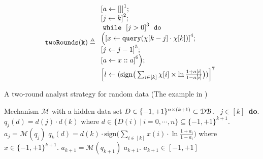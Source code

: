     \begin{example}
        \[
            \kw{twoRounds(k)} \triangleq
        \begin{array}{l}
               \clabel{ a \leftarrow []}^{1} ; \\
                \clabel{\assign{j}{k} }^{2} ; \\
                \ewhile ~ \clabel{j > 0}^{3} ~ \edo ~ \\
                \Big(
                 \clabel{\assign{x}{\query(\chi[k - j]\cdot \chi[k])} }^{4}  ; \\
                 \clabel{\assign{j}{j-1}}^{5} ;\\
                \clabel{a \leftarrow x :: a}^{6}       \Big);\\
                \clabel{l \leftarrow (\mathrm{sign}\big (\sum_{i\in [k]} \chi[i]\times\ln\frac{1+a[i]}{1-a[i]} \big ))}^{7}\\
            \end{array}
        \]
        \begin{algorithm}
        \footnotesize
        \caption{A two-round analyst strategy for random data (The example in  \cite{dwork2015generalization})}
        \label{alg:twoRound}
        \begin{algorithmic}
        \REQUIRE Mechanism $\mathcal{M}$ with a hidden data set $D \in \{-1,+1\}^{n\times (k+1)} \subset \mathcal{DB}$.
        \ $j\in [k]$\ {\bf do}.  
        \STATE {} $q_j(d)=d(j)\cdot d(k)$ where $d \in \{D(i) ~|~ i = 0, \cdots, n\} \subseteq \{-1,+1\}^{k+1}$.
        \STATE {} $a_j=\mathcal{M}(q_j)$ 
        \STATE \qquad {}
         $q_{k}(d)= d(k) \cdot \mathrm{sign}\big (\sum_{i\in [k]} x(i) \cdot \ln\frac{1+a_i}{1-a_i} \big )$ where $x\in \{-1,+1\}^{k+1}$.
        \STATE{}
         $a_{k+1}=\mathcal{M}(q_{k+1})$
        \STATE{}
        \RETURN $a_{k+1}$.
        \ENSURE $a_{k+1}\in [-1,+1]$
        \end{algorithmic}
        \end{algorithm}
        \end{example}
    

